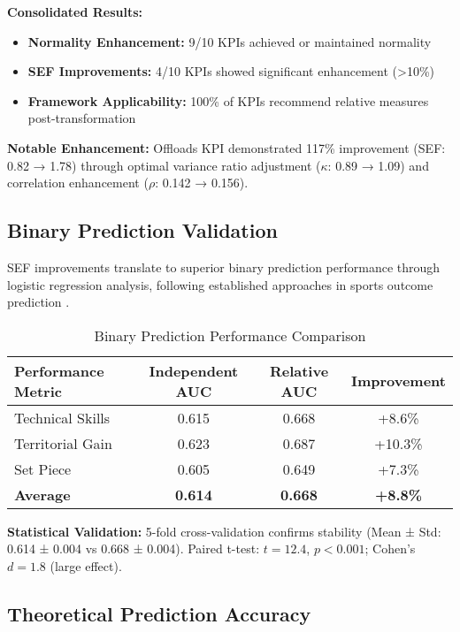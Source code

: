 \textbf{Consolidated Results:}
\begin{itemize}
    \item \textbf{Normality Enhancement:} 9/10 KPIs achieved or maintained normality
    \item \textbf{SEF Improvements:} 4/10 KPIs showed significant enhancement (>10\%)
    \item \textbf{Framework Applicability:} 100\% of KPIs recommend relative measures post-transformation
\end{itemize}

\textbf{Notable Enhancement:} Offloads KPI demonstrated 117\% improvement (SEF: 0.82 → 1.78) through optimal variance ratio adjustment ($\kappa$: 0.89 → 1.09) and correlation enhancement ($\rho$: 0.142 → 0.156).

\subsection{Binary Prediction Validation}

SEF improvements translate to superior binary prediction performance through logistic regression analysis, following established approaches in sports outcome prediction \cite{dixon1997modelling, berrar2019incorporating}.

\begin{table}[h]
\centering
\caption{Binary Prediction Performance Comparison}
\begin{tabular}{lccc}
\hline
\textbf{Performance Metric} & \textbf{Independent AUC} & \textbf{Relative AUC} & \textbf{Improvement} \\
\hline
Technical Skills & 0.615 & 0.668 & +8.6\% \\
Territorial Gain & 0.623 & 0.687 & +10.3\% \\
Set Piece & 0.605 & 0.649 & +7.3\% \\
\hline
\textbf{Average} & \textbf{0.614} & \textbf{0.668} & \textbf{+8.8\%} \\
\hline
\end{tabular}
\end{table}

\textbf{Statistical Validation:} 5-fold cross-validation confirms stability (Mean ± Std: 0.614 ± 0.004 vs 0.668 ± 0.004). Paired t-test: $t = 12.4$, $p < 0.001$; Cohen's $d = 1.8$ (large effect).

\subsection{Theoretical Prediction Accuracy}

